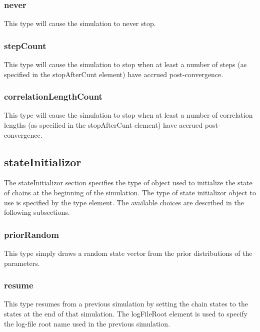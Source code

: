 \subsubsection{{\normalfont \ttfamily never}}

This type will cause the simulation to never stop.

\subsubsection{{\normalfont \ttfamily stepCount}}

This type will cause the simulation to stop when at least a number of steps (as specified in the {\normalfont \ttfamily stopAfterCunt} element) have accrued post-convergence.

\subsubsection{{\normalfont \ttfamily correlationLengthCount}}

This type will cause the simulation to stop when at least a number of correlation lengths (as specified in the {\normalfont \ttfamily stopAfterCunt} element) have accrued post-convergence.

\subsection{{\normalfont \ttfamily stateInitializor}}

The {\normalfont \ttfamily stateInitializor} section specifies the type of object used to initialize the state of chains at the beginning of the simulation. The type of state initializor object to use is specified by the {\normalfont \ttfamily type} element. The available choices are described in the following subsections.

\subsubsection{{\normalfont \ttfamily priorRandom}}

This type simply draws a random state vector from the prior distributions of the parameters.

\subsubsection{{\normalfont \ttfamily resume}}

This type resumes from a previous simulation by setting the chain states to the states at the end of that simulation. The {\normalfont \ttfamily logFileRoot} element is used to specify the log-file root name used in the previous simulation.

